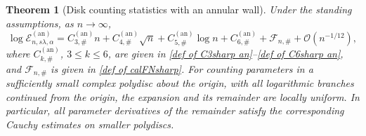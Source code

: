 \documentclass[a4paper]{article}
\newtheorem{theorem}{Theorem}[section]
\numberwithin{equation}{section}
\begin{document}
\begin{theorem}[Disk counting statistics with an annular wall]
\label{theorem:counting statistics of annulus case}
Under the standing assumptions, as $n\to\infty$,
\[
\log \mathcal{E}_{n,s\lambda,\alpha}^{(\mathrm{an})}
=C_{3,\#}^{(\mathrm{an})}n
+C_{4,\#}^{(\mathrm{an})}\sqrt n
+C_{5,\#}^{(\mathrm{an})}\log n
+C_{6,\#}^{(\mathrm{an})}
+\mathcal{F}_{n,\#}
+\mathcal{O}(n^{-1/12}),
\]
where $C_{k,\#}^{(\mathrm{an})}$, $3\leq k\leq6$, are given in
\eqref{def of C3sharp an}--\eqref{def of C6sharp an}, and
$\mathcal F_{n,\#}$ is given in \eqref{def of calFNsharp}.
For counting parameters in a sufficiently small complex polydisc about the
origin, with all logarithmic branches continued from the origin, the
expansion and its remainder are locally uniform.  In particular, all
parameter derivatives of the remainder satisfy the corresponding Cauchy
estimates on smaller polydiscs.

\end{theorem}
\end{document}
